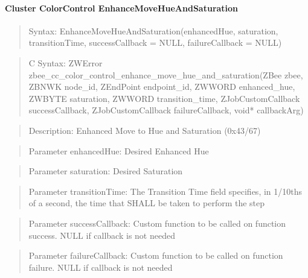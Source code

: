 \paragraph{Cluster ColorControl EnhanceMoveHueAndSaturation}
\begin{quote}Syntax: EnhanceMoveHueAndSaturation(enhancedHue, saturation, transitionTime, successCallback = NULL, failureCallback = NULL)\end{quote}
\begin{quote}C Syntax: ZWError zbee\_cc\_color\_control\_enhance\_move\_hue\_and\_saturation(ZBee zbee, ZBNWK node\_id, ZEndPoint endpoint\_id, ZWWORD enhanced\_hue, ZWBYTE saturation, ZWWORD transition\_time, ZJobCustomCallback successCallback, ZJobCustomCallback failureCallback, void* callbackArg)\end{quote}
\begin{quote}Description: Enhanced Move to Hue and Saturation (0x43/67)\end{quote}
\begin{quote}Parameter enhancedHue: Desired Enhanced Hue\end{quote}
\begin{quote}Parameter saturation: Desired Saturation\end{quote}
\begin{quote}Parameter transitionTime: The Transition Time field specifies, in 1/10ths of a second, the time that SHALL be taken to perform the step\end{quote}
\begin{quote}Parameter successCallback: Custom function to be called on function success. NULL if callback is not needed\end{quote}
\begin{quote}Parameter failureCallback: Custom function to be called on function failure. NULL if callback is not needed\end{quote}


